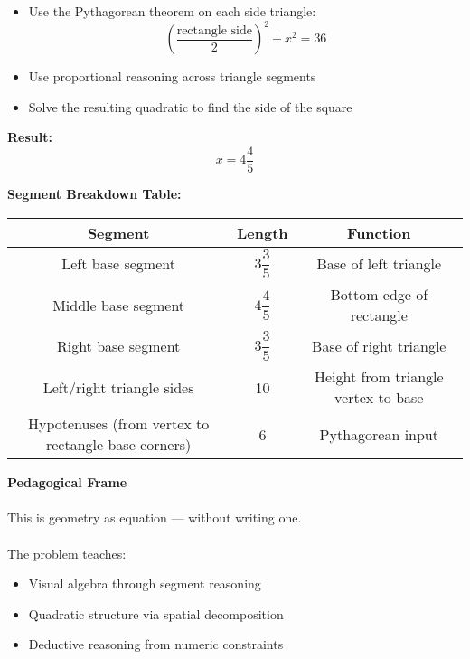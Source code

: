 \documentclass[9pt]{article}
\begin{document}
\begin{itemize}
    \item Use the Pythagorean theorem on each side triangle:
    \[
    \left(\dfrac{\text{rectangle side}}{2}\right)^2 + x^2 = 36
    \]
    \item Use proportional reasoning across triangle segments
    \item Solve the resulting quadratic to find the side of the square
\end{itemize}

\textbf{Result:}
\[
x = 4 \dfrac{4}{5}
\]

\vspace{1em}

\textbf{Segment Breakdown Table:}
\begin{center}
\begin{tabular}{|c|c|c|}
\hline
\textbf{Segment} & \textbf{Length} & \textbf{Function} \\\hline
Left base segment & $3 \dfrac{3}{5}$ & Base of left triangle \\\hline
Middle base segment & $4 \dfrac{4}{5}$ & Bottom edge of rectangle \\\hline
Right base segment & $3 \dfrac{3}{5}$ & Base of right triangle \\\hline
Left/right triangle sides & 10 & Height from triangle vertex to base \\\hline
Hypotenuses (from vertex to rectangle base corners) & 6 & Pythagorean input \\\hline
\end{tabular}
\end{center}

\vspace{1em}


\textbf{Pedagogical Frame} \\\\
This is geometry as equation — without writing one. \\\\
The problem teaches:
\begin{itemize}
    \item Visual algebra through segment reasoning
    \item Quadratic structure via spatial decomposition
    \item Deductive reasoning from numeric constraints
\end{itemize}

\vspace{1em}
\end{document}
